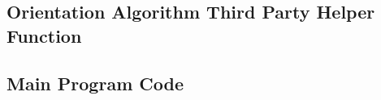 \documentclass{article}
\begin{document}





\subsection{Orientation Algorithm Third Party Helper Function}





\subsection{Main Program Code}
\label{code:main}

%
%
 
\end{document}
